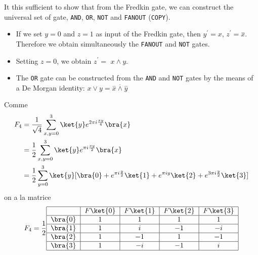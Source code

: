 \begin{solution}

It this sufficient to show that from the Fredkin gate, we can construct the
universal set of gate, \texttt{AND}, \texttt{OR}, \texttt{NOT} and
\texttt{FANOUT} (\texttt{COPY}).

\begin{itemize}
\item If we set $y=0$ and $z=1$ as input of the Fredkin gate, then $y^{\prime
}=x$, $z^{\prime}=\overset{-}{x}$. Therefore we obtain simultaneously the
\texttt{FANOUT} and \texttt{NOT} gates.

\item Setting $z=0$, we obtain $z^{\prime}=$ $x\wedge y$.

\item The \texttt{OR} gate can be constructed from the \texttt{AND} and
\texttt{NOT} gates by the means of a De Morgan identity: $x\vee
y=\overline{\overset{-}{x}\wedge\overset{-}{y}}$
\end{itemize}
\end{solution}

\begin{solution}[Matrice de $F_4$]
Comme
\begin{equation}
\begin{split}
F_4 & =\frac{1}{\sqrt{4}}\sum_{x,y=0}^{3}\ket{y} e^{2\pi i\frac{xy}{4}}\bra{x}\\
&  =\frac{1}{2}\sum_{x,y=0}^{3}\ket{y} e^{\pi i\frac{xy}{2}}\bra{x}\\
&  =\frac{1}{2}\sum_{y=0}^{3}\ket{y}[\bra{0}+e^{\pi i\frac{y}{2}}\ket{1}
+e^{\pi iy}\ket{2} +e^{3\pi i\frac{y}{2}}\ket{3}]
\end{split}
\end{equation}
on a la matrice
\begin{equation}
F_4=\frac{1}{2}%
\begin{tabular}
[c]{|c|c|c|c|c|}\hline
& $F\ket{0}$ & $F\ket{1}$ & $F\ket{2}$ & $F\ket{3}$\\\hline
$\bra{0} $ & $1$ & $1$ & $1$ & $1$\\\hline
$\bra{1} $ & $1$ & $i$ & $-1$ & $-i$\\\hline
$\bra{2} $ & $1$ & $-1$ & $1$ & $-1$\\\hline
$\bra{3} $ & $1$ & $-i$ & $-1$ & $i$\\\hline
\end{tabular}
\end{equation}
\end{solution}


